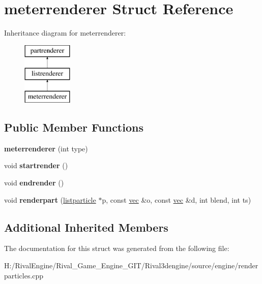 \hypertarget{structmeterrenderer}{}\section{meterrenderer Struct Reference}
\label{structmeterrenderer}
Inheritance diagram for meterrenderer\+:\begin{figure}[H]
\begin{center}
\leavevmode
\includegraphics[height=3.000000cm]{structmeterrenderer}
\end{center}
\end{figure}
\subsection*{Public Member Functions}
\begin{DoxyCompactItemize}
\item 
\mbox{\label{structmeterrenderer_acce5e53e775d2859354009f68810a48d}} 
{\bfseries meterrenderer} (int type)
\item 
\mbox{\label{structmeterrenderer_a76343b1186eb0ca78cc09dcd5cb679ad}} 
void {\bfseries startrender} ()
\item 
\mbox{\label{structmeterrenderer_ae700ac6ba91aadfa447360bca8874ce3}} 
void {\bfseries endrender} ()
\item 
\mbox{\label{structmeterrenderer_a6649b04c40b14c93e8ebe7b5430245d4}} 
void {\bfseries renderpart} (\hyperlink{structlistparticle}{listparticle} $\ast$p, const \hyperlink{structvec}{vec} \&o, const \hyperlink{structvec}{vec} \&d, int blend, int ts)
\end{DoxyCompactItemize}
\subsection*{Additional Inherited Members}


The documentation for this struct was generated from the following file\+:\begin{DoxyCompactItemize}
\item 
H\+:/\+Rival\+Engine/\+Rival\+\_\+\+Game\+\_\+\+Engine\+\_\+\+G\+I\+T/\+Rival3dengine/source/engine/renderparticles.\+cpp\end{DoxyCompactItemize}
